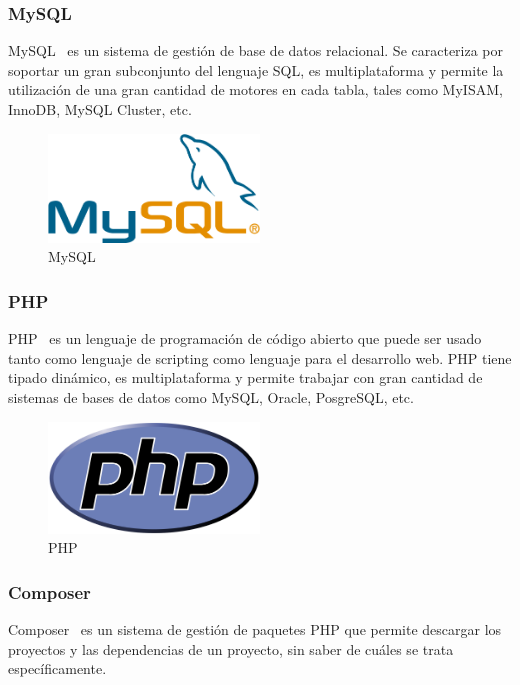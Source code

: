 \subsubsection*{MySQL}

MySQL~\cite{mysql} es un sistema de gestión de base de datos relacional. Se caracteriza por soportar un gran subconjunto del lenguaje SQL, es multiplataforma y permite la utilización de una gran cantidad de motores en cada tabla, tales como MyISAM, InnoDB, MySQL Cluster, etc.

\begin{figure}[tbh]
\centering
\label{fig:mysql}
\includegraphics[width=0.5\textwidth]{imagenes/MySQL}
\caption{MySQL}
\end{figure}

\subsubsection*{PHP}

PHP~\cite{php} es un lenguaje de programación de código abierto que puede ser usado tanto como lenguaje de scripting como lenguaje para el desarrollo web. PHP tiene tipado dinámico, es multiplataforma y permite trabajar con gran cantidad de sistemas de bases de datos como MySQL, Oracle, PosgreSQL, etc.

\begin{figure}[tbh]
\centering
\label{fig:php}
\includegraphics[width=0.5\textwidth]{imagenes/PHP}
\caption{PHP}
\end{figure}

\subsubsection*{Composer}

Composer~\cite{composer} es un sistema de gestión de paquetes PHP que permite descargar los proyectos y las dependencias de un proyecto, sin saber de cuáles se trata específicamente.

